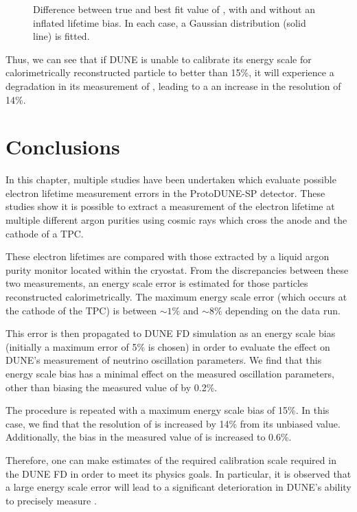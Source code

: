 \begin{figure}[h]
	\begin{adjustbox}{max totalsize=.6\textwidth, center}
		
	\end{adjustbox}
	\caption[Difference between true and best fit value of , with and without an inflated lifetime bias.]{Difference between true and best fit value of , with and without an inflated lifetime bias. In each case, a Gaussian distribution (solid line) is fitted.}
	\label{fig:paramComp15pc:dmsq32}
\end{figure}

Thus, we can see that if DUNE is unable to calibrate its energy scale for calorimetrically reconstructed particle to better than 15\%, it will experience a degradation in its measurement of \dcp, leading to a an increase in the \dcp resolution of 14\%.

\section{Conclusions}
\label{sec:pdune_calibration:conclusions}

In this chapter, multiple studies have been undertaken which evaluate possible electron lifetime measurement errors in the ProtoDUNE-SP detector.
These studies show it is possible to extract a measurement of the electron lifetime at multiple different argon purities using cosmic rays which cross the anode and the cathode of a TPC.

These electron lifetimes are compared with those extracted by a liquid argon purity monitor located within the cryostat.
From the discrepancies between these two measurements, an energy scale error is estimated for those particles reconstructed calorimetrically.
The maximum energy scale error (which occurs at the cathode of the TPC) is between $\sim 1\%$ and $\sim 8\%$ depending on the data run.

This error is then propagated to DUNE FD simulation as an energy scale bias (initially a maximum error of 5\% is chosen) in order to evaluate the effect on DUNE's measurement of neutrino oscillation parameters.
We find that this energy scale bias has a minimal effect on the measured oscillation parameters, other than biasing the measured value of  by 0.2\%.

The procedure is repeated with a maximum energy scale bias of 15\%. 
In this case, we find that the resolution of \dcp is increased by 14\% from its unbiased value.
Additionally, the bias in the measured value of  is increased to 0.6\%.

Therefore, one can make estimates of the required calibration scale required in the DUNE FD in order to meet its physics goals.
In particular, it is observed that a large energy scale error will lead to a significant deterioration in DUNE's ability to precisely measure \dcp.